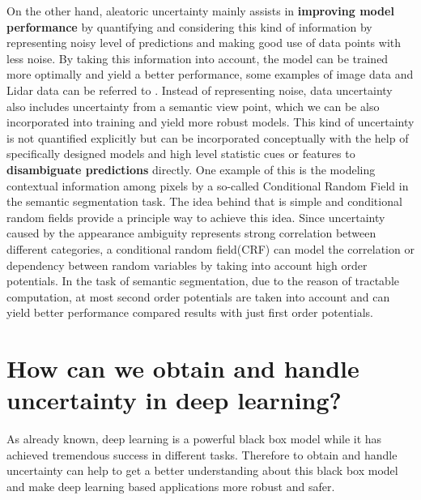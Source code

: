 On the other hand, aleatoric uncertainty mainly assists in \textbf{improving model performance} by quantifying and considering this kind of information by representing noisy level of predictions and making good use of data points with less noise. By taking this information into account, the model can be trained more optimally and yield a better performance, some examples of image data and Lidar data can be referred to \cite{kendall2016modelling}\cite{feng2018towards}. Instead of representing noise, data uncertainty also includes uncertainty from a semantic view point, which we can be also incorporated into training and yield more robust models. This kind of uncertainty is not quantified explicitly but can be incorporated conceptually with the help of specifically designed models and high level statistic cues or features to \textbf{disambiguate predictions} directly. One example of this is the modeling contextual information among pixels by a so-called Conditional Random Field 
in the semantic segmentation task\cite{krahenbuhl2011efficient}\cite{sutton2012introduction}\cite{lin2016efficient}. The idea behind that is simple and conditional random fields provide a principle way to achieve this idea. Since uncertainty caused by the appearance ambiguity represents strong correlation between different categories, a conditional random field(CRF) can model the correlation or dependency between random variables by taking into account high order potentials. In the task of semantic segmentation, due to the reason of tractable computation, at most second order potentials are taken into account and can yield better performance compared results with just first order potentials. 
\section{How can we obtain and handle uncertainty in deep learning?}
As already known, deep learning is a powerful black box model while it has achieved tremendous success in different tasks. Therefore to obtain and handle uncertainty can help to get a better understanding about this black box model and make deep learning based applications more robust and safer. 

